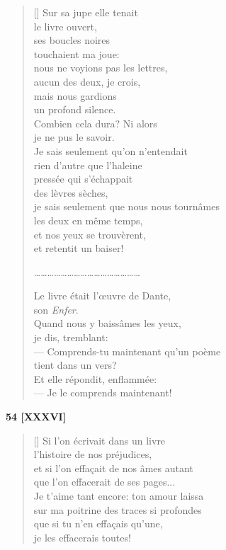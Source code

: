 \documentclass[a4paper,12pt]{book}
\begin{document}
\begin{verse}[\versewidth]
  Sur sa jupe elle tenait \\
  le livre ouvert, \\
  ses boucles noires \\
  touchaient ma joue:\\
  nous ne voyions pas les lettres, \\
  aucun des deux, je crois, \\
  mais nous gardions \\
  un profond silence. \\
  Combien cela dura? Ni alors \\
  je ne pus le savoir. \\
  Je sais seulement qu'on n'entendait \\
  rien d'autre que l'haleine \\
  pressée qui s'échappait \\
  des lèvres sèches, \\
  je sais seulement que nous nous tournâmes \\
  les deux en même temps, \\
  et nos yeux se trouvèrent, \\
  et retentit un baiser!

\ldots\ldots\ldots\ldots\ldots\ldots\ldots\ldots\ldots\ldots\ldots\ldots\ldots\ldots\ldots\ldots

  Le livre était l'œuvre de Dante, \\
  son \emph{Enfer}. \\
  Quand nous y baissâmes les yeux, \\
  je dis, tremblant: \\
  --- Comprends-tu maintenant qu'un poème \\
    tient dans un vers? \\
  Et elle répondit, enflammée: \\
  --- Je le comprends maintenant!
\end{verse}

\bigskip

\begin{center}
  \textbf{54 [XXXVI]}
\end{center}

\settowidth{\versewidth}{et si s'effaçait de nos âmes autant}

\begin{verse}[\versewidth]
  Si l'on écrivait dans un livre \\
  l'histoire de nos préjudices, \\
  et si l'on effaçait de nos âmes autant \\
  que l'on effacerait de ses pages... \\
  Je t'aime tant encore: ton amour laissa \\
  sur ma poitrine des traces si profondes \\
  que si tu n'en effaçais qu'une, \\
  je les effacerais toutes!
\end{verse}
\end{document}
